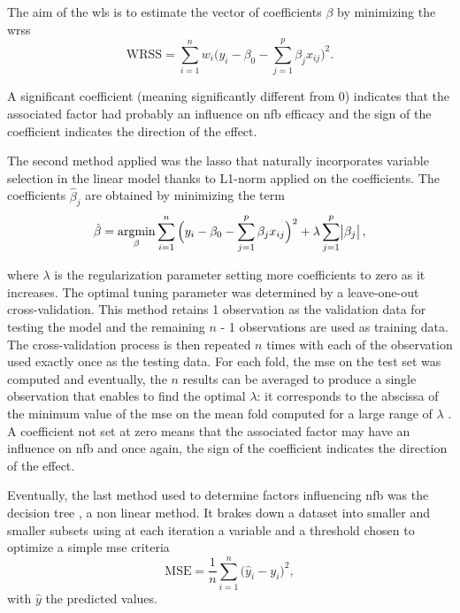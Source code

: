 \documentclass[12pt,a4paper,english]{article}
\DeclareMathOperator*{\argmin}{argmin}
\begin{document}
The aim of the \gls{wls} is to estimate the vector of coefficients $\beta$ by minimizing the \gls{wrss}
\begin{equation}
\label{eq:factors_WRSS}
\text{WRSS} = \sum_{i=1}^{n} w_i \Big(y_i - \beta_{0} - \sum_{j=1}^{p}\beta_{j}x_{ij}\Big)^2.
\end{equation}

A significant coefficient (meaning significantly different from 0) indicates that the associated factor had probably an influence on \gls{nfb} efficacy and the sign 
of the coefficient indicates the direction of the effect.

The second method applied was the \gls{lasso} that naturally incorporates variable selection 
in the linear model thanks to L1-norm applied on the coefficients. The coefficients $\hat{\beta}_j$ are obtained by minimizing the term
\begin{equation}
\label{eq:factors_lasso-minimization}
\hat{\beta} = \argmin_\beta \sum_{i=1}^{n} \Big(y_i - \beta_{0} - \sum_{j=1}^{p}\beta_{j}x_{ij}\Big)^2 + \lambda \sum_{j=1}^{p}\abs{\beta_{j}},
\end{equation} 

where $\lambda$ is the regularization parameter setting more coefficients to zero as it increases. The optimal tuning parameter was determined 
by a leave-one-out cross-validation. This method retains 1 observation as the validation data for testing the model and the 
remaining $n$ - 1 observations are used as training data. The cross-validation process is then repeated $n$ times with each of the observation 
used exactly once as the testing data. For each fold, the \gls{mse} on the test set was computed and eventually, the $n$ results can 
be averaged to produce a single observation that enables to find the optimal $\lambda$: it corresponds to the abscissa of the minimum
value of the \gls{mse} on the mean fold computed for a large range of $\lambda$ \citep{James2013}. 
A coefficient not set at zero means that the associated factor may have an influence on \gls{nfb} and once again,
the sign of the coefficient indicates the direction of the effect.

Eventually, the last method used to determine factors influencing \gls{nfb} was the decision tree \citep{Quinlan1986}, a non linear method. It brakes down a dataset into smaller
and smaller subsets using at each iteration a variable and a threshold chosen to optimize a simple \gls{mse} criteria 
\begin{equation}
\label{eq:factors_decision_tree_mse}
\text{MSE} = \frac{1}{n}\sum_{i=1}^{n} \Big(\hat{y}_i - {y}_i\Big)^2,
\end{equation}
with $\hat{y}$ the predicted values.
\end{document}
